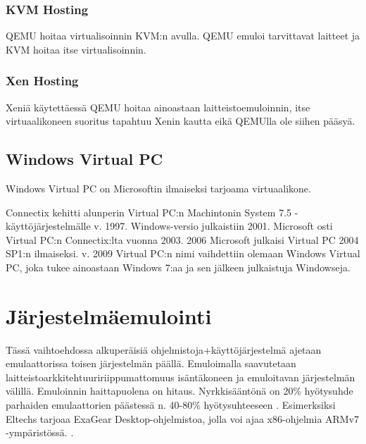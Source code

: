 
\subsubsection{KVM Hosting}
QEMU hoitaa virtualisoinnin KVM:n avulla. QEMU emuloi tarvittavat laitteet ja KVM hoitaa itse virtualisoinnin.

\subsubsection{Xen Hosting}
Xeniä käytettäessä QEMU hoitaa ainoastaan laitteistoemuloinnin, itse virtuaalikoneen suoritus tapahtuu Xenin kautta eikä QEMUlla ole siihen pääsyä.

\lipsum[1-2]


\subsection{Windows Virtual PC}
Windows Virtual PC on Microsoftin ilmaiseksi tarjoama virtuaalikone.

Connectix kehitti alunperin Virtual PC:n Machintonin System 7.5 -käyttöjärjestelmälle v. 1997. Windows-versio julkaistiin 2001. Microsoft osti Virtual PC:n Connectix:lta vuonna 2003. 2006 Microsoft julkaisi Virtual PC 2004 SP1:n ilmaiseksi. v. 2009 Virtual PC:n nimi vaihdettiin olemaan Windows Virtual PC, joka tukee ainoastaan Windows 7:aa ja sen jälkeen julkaistuja Windowseja.


\section{Järjestelmäemulointi}

Tässä vaihtoehdossa alkuperäisiä ohjelmistoja+käyttöjärjestelmä ajetaan emulaattorissa toisen järjestelmän päällä. Emuloimalla saavutetaan laitteistoarkkitehtuuririippumattomuus isäntäkoneen ja emuloitavan järjestelmän välillä. Emuloinnin haittapuolena on hitaus. Nyrkkisääntönä on 20\% hyötysuhde \cite{tinycc} parhaiden emulaattorien päästessä n. 40-80\% hyötysuhteeseen \cite{40pperf}. Esimerksiksi Eltechs tarjoaa ExaGear Desktop-ohjelmistoa, jolla voi ajaa x86-ohjelmia ARMv7 -ympäristössä. \cite{eltechs:exagear}. 

